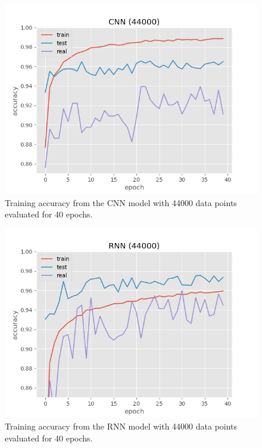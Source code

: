 \begin{figure}[H]
    \centering
    \includegraphics[width=0.8\linewidth]{Assets/Chapter4_Result/CNN_40_epoch.png}
    \caption{Training accuracy from the CNN model with 44000 data points evaluated for 40 epochs.}
    \label{fig:CNN_44000}
\end{figure}
\begin{figure}[H]
    \centering
    \includegraphics[width=0.8\linewidth]{Assets/Chapter4_Result/RNN_40_epoch.png}
    \caption{Training accuracy from the RNN model with 44000 data points evaluated for 40 epochs.}
    \label{fig:RNN_44000}
\end{figure}

